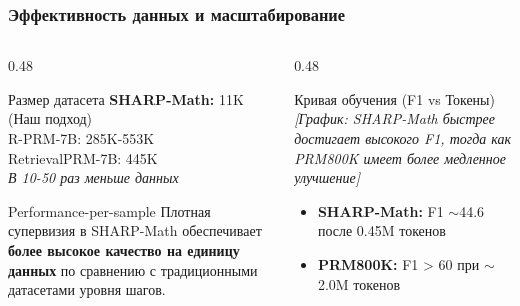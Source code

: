 \documentclass{beamer}
\begin{document}
\begin{frame}
  \frametitle{Эффективность данных и масштабирование}
  
  \begin{columns}[T]
      \begin{column}{0.48\textwidth}
          \begin{block}{Размер датасета}
              \textbf{SHARP-Math:} 11K (Наш подход) \\
              R-PRM-7B: 285K-553K \\
              RetrievalPRM-7B: 445K \\
              \vspace{0.5em}
              \textit{В 10-50 раз меньше данных}
          \end{block}
          \begin{block}{Performance-per-sample}
              Плотная супервизия в SHARP-Math обеспечивает \textbf{более высокое качество на единицу данных} по сравнению с традиционными датасетами уровня шагов.
          \end{block}
      \end{column}
      
      \begin{column}{0.48\textwidth}
          \begin{block}{Кривая обучения (F1 vs Токены)}
              \centering
              \textit{[График: SHARP-Math быстрее достигает высокого F1, тогда как PRM800K имеет более медленное улучшение]}
              
              \vspace{0.5em}
              \footnotesize
              \begin{itemize}
                  \item \textbf{SHARP-Math:} F1 $\sim$44.6 после 0.45M токенов
                  \item \textbf{PRM800K:} F1 > 60 при $\sim$2.0M токенов
              \end{itemize}
          \end{block}
      \end{column}
  \end{columns}
\end{frame}
\end{document}
